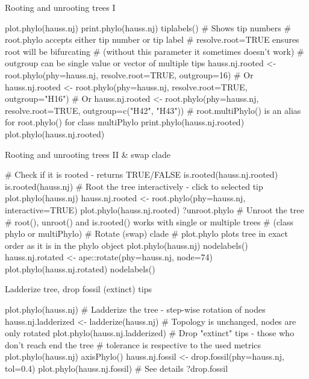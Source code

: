 \documentclass[compress, ucs, xelatex, 11pt, xcolor=svgnames, aspectratio=169,
	hyperref={
		bookmarks=true,
		unicode=true,
		colorlinks=true,
		pdftitle={Molecular data in R},
		plainpages=false,
		pdfauthor={Vojtech Zeisek},
		pdfsubject={Course about phylogeny and evolution in R},
		pdfcreator={XeLaTeX},
		pdfkeywords={R, evolution, phylogeny, molecular data},
		linkcolor=Crimson, %
		anchorcolor=Magenta, %
		citecolor=Magenta, %
		filecolor=Magenta, %
		menucolor=Magenta, %
		urlcolor=DodgerBlue, %
		pdftex},
	url={hyphens, lowtilde} %
	]{beamer}
\begin{document}
\begin{frame}[fragile]{Rooting and unrooting trees I}
	\begin{spluscode}
    plot.phylo(hauss.nj)
    print.phylo(hauss.nj)
    tiplabels() # Shows tip numbers
    # root.phylo accepts either tip number or tip label
    # resolve.root=TRUE ensures root will be bifurcating
    # (without this parameter it sometimes doesn't work)
    # outgroup can be single value or vector of multiple tips
    hauss.nj.rooted <- root.phylo(phy=hauss.nj, resolve.root=TRUE,
      outgroup=16) # Or
    hauss.nj.rooted <- root.phylo(phy=hauss.nj, resolve.root=TRUE,
      outgroup="H16") # Or
    hauss.nj.rooted <- root.phylo(phy=hauss.nj, resolve.root=TRUE,
      outgroup=c("H42", "H43"))
    # root.multiPhylo() is an alias for root.phylo() for class multiPhylo
    print.phylo(hauss.nj.rooted)
    plot.phylo(hauss.nj.rooted)
	\end{spluscode}
\end{frame}

\begin{frame}[fragile]{Rooting and unrooting trees II \& swap clade}
	\begin{spluscode}
    # Check if it is rooted - returns TRUE/FALSE
    is.rooted(hauss.nj.rooted)
    is.rooted(hauss.nj)
    # Root the tree interactively - click to selected tip
    plot.phylo(hauss.nj)
    hauss.nj.rooted <- root.phylo(phy=hauss.nj, interactive=TRUE)
    plot.phylo(hauss.nj.rooted)
    ?unroot.phylo # Unroot the tree
    # root(), unroot() and is.rooted() works with single or multiple trees
    # (class phylo or multiPhylo)
    # Rotate (swap) clade
    # plot.phylo plots tree in exact order as it is in the phylo object
    plot.phylo(hauss.nj)
    nodelabels()
    hauss.nj.rotated <- ape::rotate(phy=hauss.nj, node=74)
    plot.phylo(hauss.nj.rotated)
    nodelabels()
	\end{spluscode}
\end{frame}

\begin{frame}[fragile]{Ladderize tree, drop fossil (extinct) tips}
	\begin{spluscode}
    plot.phylo(hauss.nj)
    # Ladderize the tree - step-wise rotation of nodes
    hauss.nj.ladderized <- ladderize(hauss.nj)
    # Topology is unchanged, nodes are only rotated
    plot.phylo(hauss.nj.ladderized)
    # Drop "extinct" tips - those who don't reach end the tree
    # tolerance is respective to the used metrics
    plot.phylo(hauss.nj)
    axisPhylo()
    hauss.nj.fossil <- drop.fossil(phy=hauss.nj, tol=0.4)
    plot.phylo(hauss.nj.fossil)
    # See details
    ?drop.fossil
	\end{spluscode}
\end{frame}
\end{document}
